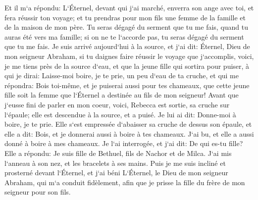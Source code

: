 \verse Et il m`a répondu: L`Éternel, devant qui j`ai marché, enverra son ange avec toi, et fera réussir ton voyage; et tu prendras pour mon fils une femme de la famille et de la maison de mon père. 
\verse Tu seras dégagé du serment que tu me fais, quand tu auras été vers ma famille; si on ne te l`accorde pas, tu seras dégagé du serment que tu me fais. 
\verse Je suis arrivé aujourd`hui à la source, et j`ai dit: Éternel, Dieu de mon seigneur Abraham, si tu daignes faire réussir le voyage que j`accomplis, 
\verse voici, je me tiens près de la source d`eau, et que la jeune fille qui sortira pour puiser, à qui je dirai: Laisse-moi boire, je te prie, un peu d`eau de ta cruche, et qui me répondra: 
\verse Bois toi-même, et je puiserai aussi pour tes chameaux, que cette jeune fille soit la femme que l`Éternel a destinée au fils de mon seigneur! 
\verse Avant que j`eusse fini de parler en mon coeur, voici, Rebecca est sortie, sa cruche sur l`épaule; elle est descendue à la source, et a puisé. Je lui ai dit: Donne-moi à boire, je te prie. 
\verse Elle s`est empressée d`abaisser sa cruche de dessus son épaule, et elle a dit: Bois, et je donnerai aussi à boire à tes chameaux. J`ai bu, et elle a aussi donné à boire à mes chameaux. 
\verse Je l`ai interrogée, et j`ai dit: De qui es-tu fille? Elle a répondu: Je suis fille de Bethuel, fils de Nachor et de Milca. J`ai mis l`anneau à son nez, et les bracelets à ses mains. 
\verse Puis je me suis incliné et prosterné devant l`Éternel, et j`ai béni L`Éternel, le Dieu de mon seigneur Abraham, qui m`a conduit fidèlement, afin que je prisse la fille du frère de mon seigneur pour son fils. 
